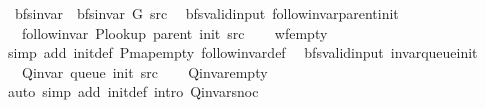 \begin{isabellebody}
\ \ {\isachardoublequoteopen}bfs{\isacharunderscore}{\kern0pt}invar{\isacharprime}{\kern0pt}{\isacharprime}{\kern0pt}\ {\isasymequiv}\ bfs{\isacharunderscore}{\kern0pt}invar{\isacharprime}{\kern0pt}\ G\ src{\isachardoublequoteclose}\isanewline
\isanewline
{}\isamarkupfalse%
\ {\isacharparenleft}{\kern0pt}\ bfs{\isacharunderscore}{\kern0pt}valid{\isacharunderscore}{\kern0pt}input{\isacharparenright}{\kern0pt}\ follow{\isacharunderscore}{\kern0pt}invar{\isacharunderscore}{\kern0pt}parent{\isacharunderscore}{\kern0pt}init{\isacharcolon}{\kern0pt}\isanewline
\ \ \ {\isachardoublequoteopen}follow{\isacharunderscore}{\kern0pt}invar\ {\isacharparenleft}{\kern0pt}P{\isacharunderscore}{\kern0pt}lookup\ {\isacharparenleft}{\kern0pt}parent\ {\isacharparenleft}{\kern0pt}init\ src{\isacharparenright}{\kern0pt}{\isacharparenright}{\kern0pt}{\isacharparenright}{\kern0pt}{\isachardoublequoteclose}%
\endisataginvisible
{\isafoldinvisible}%
%
\isadeliminvisible
\isanewline
%
\endisadeliminvisible
%
\isadelimproof
\ \ %
\endisadelimproof
%
\isatagproof
{}\isamarkupfalse%
\ wf{\isacharunderscore}{\kern0pt}empty\isanewline
\ \ \isamarkupfalse%
\ {\isacharparenleft}{\kern0pt}simp\ add{\isacharcolon}{\kern0pt}\ init{\isacharunderscore}{\kern0pt}def\ P{\isachardot}{\kern0pt}map{\isacharunderscore}{\kern0pt}empty\ follow{\isacharunderscore}{\kern0pt}invar{\isacharunderscore}{\kern0pt}def{\isacharparenright}{\kern0pt}%
\endisatagproof
{\isafoldproof}%
%
\isadelimproof
\isanewline
%
\endisadelimproof
%
\isadeliminvisible
\isanewline
%
\endisadeliminvisible
%
\isataginvisible
{}\isamarkupfalse%
\ {\isacharparenleft}{\kern0pt}\ bfs{\isacharunderscore}{\kern0pt}valid{\isacharunderscore}{\kern0pt}input{\isacharparenright}{\kern0pt}\ invar{\isacharunderscore}{\kern0pt}queue{\isacharunderscore}{\kern0pt}init{\isacharcolon}{\kern0pt}\isanewline
\ \ \ {\isachardoublequoteopen}Q{\isacharunderscore}{\kern0pt}invar\ {\isacharparenleft}{\kern0pt}queue\ {\isacharparenleft}{\kern0pt}init\ src{\isacharparenright}{\kern0pt}{\isacharparenright}{\kern0pt}{\isachardoublequoteclose}%
\endisataginvisible
{\isafoldinvisible}%
%
\isadeliminvisible
\isanewline
%
\endisadeliminvisible
%
\isadelimproof
\ \ %
\endisadelimproof
%
\isatagproof
{}\isamarkupfalse%
\ Q{\isachardot}{\kern0pt}invar{\isacharunderscore}{\kern0pt}empty\isanewline
\ \ \isamarkupfalse%
\ {\isacharparenleft}{\kern0pt}auto\ simp\ add{\isacharcolon}{\kern0pt}\ init{\isacharunderscore}{\kern0pt}def\ intro{\isacharcolon}{\kern0pt}\ Q{\isachardot}{\kern0pt}invar{\isacharunderscore}{\kern0pt}snoc{\isacharparenright}{\kern0pt}%

\end{isabellebody}
